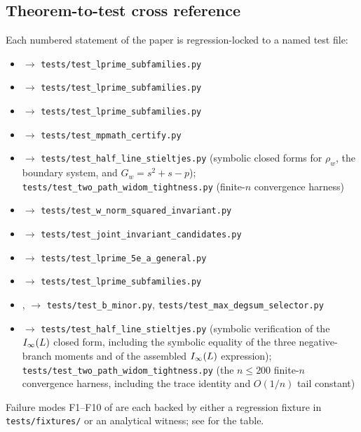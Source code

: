 \subsection{Theorem-to-test cross reference}\label{app:repro:xref}

Each numbered statement of the paper is regression-locked to a named
test file:
\begin{itemize}
\item {} \(\to\) \texttt{tests/test\_lprime\_subfamilies.py}
\item {} \(\to\) \texttt{tests/test\_lprime\_subfamilies.py}
\item {} \(\to\) \texttt{tests/test\_lprime\_subfamilies.py}
\item {} \(\to\) \texttt{tests/test\_mpmath\_certify.py}
\item {} \(\to\) \texttt{tests/test\_half\_line\_stieltjes.py} (symbolic closed forms for $\rho_{w}$, the boundary system, and $G_{w} = s^{2} + s - p$); \texttt{tests/test\_two\_path\_widom\_tightness.py} (finite-$n$ convergence harness)
\item {} \(\to\) \texttt{tests/test\_w\_norm\_squared\_invariant.py}
\item {} \(\to\) \texttt{tests/test\_joint\_invariant\_candidates.py}
\item {} \(\to\) \texttt{tests/test\_lprime\_5e\_a\_general.py}
\item {} \(\to\) \texttt{tests/test\_lprime\_subfamilies.py}
\item {},  \(\to\) \texttt{tests/test\_b\_minor.py}, \texttt{tests/test\_max\_degsum\_selector.py}
\item {} \(\to\) \texttt{tests/test\_half\_line\_stieltjes.py} (symbolic verification of the $I_{\infty}(L)$ closed form, including the symbolic equality of the three negative-branch moments and of the assembled $I_{\infty}(L)$ expression); \texttt{tests/test\_two\_path\_widom\_tightness.py} (the $n \le 200$ finite-$n$ convergence harness, including the trace identity and $O(1/n)$ tail constant)
\end{itemize}
Failure modes F1--F10 of  are each backed by
either a regression fixture in \texttt{tests/fixtures/} or an
analytical witness; see  for the table.
